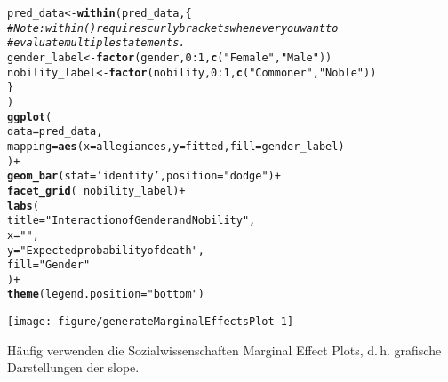 \documentclass{article}\usepackage[]{graphicx}\usepackage[]{color}
\makeatletter
\def\maxwidth{ %
  \ifdim\Gin@nat@width>\linewidth
    \linewidth
  \else
    \Gin@nat@width
  \fi
}
\newcommand{\hlnum}[1]{\textcolor[rgb]{0.686,0.059,0.569}{#1}}%
\newcommand{\hlstr}[1]{\textcolor[rgb]{0.192,0.494,0.8}{#1}}%
\newcommand{\hlcom}[1]{\textcolor[rgb]{0.678,0.584,0.686}{\textit{#1}}}%
\newcommand{\hlopt}[1]{\textcolor[rgb]{0,0,0}{#1}}%
\newcommand{\hlstd}[1]{\textcolor[rgb]{0.345,0.345,0.345}{#1}}%
\newcommand{\hlkwb}[1]{\textcolor[rgb]{0.69,0.353,0.396}{#1}}%
\newcommand{\hlkwc}[1]{\textcolor[rgb]{0.333,0.667,0.333}{#1}}%
\newcommand{\hlkwd}[1]{\textcolor[rgb]{0.737,0.353,0.396}{\textbf{#1}}}%
\newenvironment{kframe}{%
 \def\at@end@of@kframe{}%
 \ifinner\ifhmode%
  \def\at@end@of@kframe{\end{minipage}}%
  \begin{minipage}{\columnwidth}%
 \fi\fi%
 \def\FrameCommand##1{\hskip\@totalleftmargin \hskip-\fboxsep
 \colorbox{shadecolor}{##1}\hskip-\fboxsep
     \hskip-\linewidth \hskip-\@totalleftmargin \hskip\columnwidth}%
 \MakeFramed {\advance\hsize-\width
   \@totalleftmargin\z@ \linewidth\hsize
   \@setminipage}}%
 {\par\unskip\endMakeFramed%
 \at@end@of@kframe}
\newenvironment{knitrout}{}{} %
\makeatother
\begin{document}
\begin{knitrout}
\color{fgcolor}\begin{kframe}
\begin{alltt}
\hlstd{pred_data} \hlkwb{<-} \hlkwd{within}\hlstd{(pred_data, \{}
  \hlcom{# Note: within() requires curly brackets whenever you want to}
  \hlcom{# evaluate multiple statements.}
  \hlstd{gender_label} \hlkwb{<-} \hlkwd{factor}\hlstd{(gender,} \hlnum{0}\hlopt{:}\hlnum{1}\hlstd{,} \hlkwd{c}\hlstd{(}\hlstr{"Female"}\hlstd{,} \hlstr{"Male"}\hlstd{))}
  \hlstd{nobility_label} \hlkwb{<-} \hlkwd{factor}\hlstd{(nobility,} \hlnum{0}\hlopt{:}\hlnum{1}\hlstd{,} \hlkwd{c}\hlstd{(}\hlstr{"Commoner"}\hlstd{,} \hlstr{"Noble"}\hlstd{))}
  \hlstd{\}}
\hlstd{)}
\hlkwd{ggplot}\hlstd{(}
  \hlkwc{data} \hlstd{= pred_data,}
  \hlkwc{mapping} \hlstd{=} \hlkwd{aes}\hlstd{(}\hlkwc{x} \hlstd{= allegiances,} \hlkwc{y} \hlstd{= fitted,} \hlkwc{fill} \hlstd{= gender_label)}
\hlstd{)} \hlopt{+}
  \hlkwd{geom_bar}\hlstd{(}\hlkwc{stat} \hlstd{=} \hlstr{'identity'}\hlstd{,} \hlkwc{position} \hlstd{=} \hlstr{"dodge"}\hlstd{)} \hlopt{+}
  \hlkwd{facet_grid}\hlstd{(} \hlopt{~} \hlstd{nobility_label)} \hlopt{+}
  \hlkwd{labs}\hlstd{(}
    \hlkwc{title} \hlstd{=} \hlstr{"Interaction of Gender and Nobility"}\hlstd{,}
    \hlkwc{x} \hlstd{=} \hlstr{""}\hlstd{,}
    \hlkwc{y} \hlstd{=} \hlstr{"Expected probability of death"}\hlstd{,}
    \hlkwc{fill} \hlstd{=} \hlstr{"Gender"}
  \hlstd{)} \hlopt{+}
  \hlkwd{theme}\hlstd{(}\hlkwc{legend.position} \hlstd{=} \hlstr{"bottom"}\hlstd{)}
\end{alltt}
\end{kframe}

{\centering \texttt{[image: figure/generateMarginalEffectsPlot-1]} 

}



\end{knitrout}

Häufig verwenden die Sozialwissenschaften Marginal Effect Plots,
d.\,h. grafische Darstellungen der slope.
\end{document}
